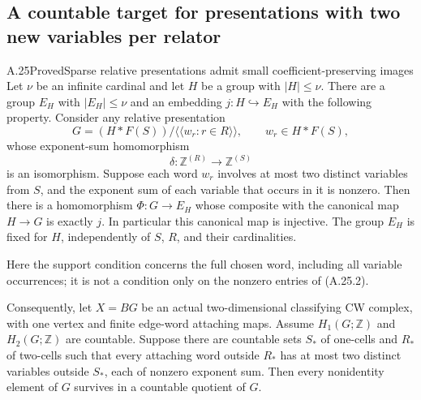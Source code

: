 \subsection{A countable target for presentations with two new variables per relator}

\begin{claim}{A.25}{Proved}{Sparse relative presentations admit small coefficient-preserving images}
Let $\nu$ be an infinite cardinal and let $H$ be a group with
$|H|\leq\nu$. There are a group $E_H$ with $|E_H|\leq\nu$ and an
embedding $j:H\hookrightarrow E_H$ with the following property.
Consider any relative presentation
\[
 G=(H*F(S))/\langle\!\langle w_r:r\in R\rangle\!\rangle,
 \qquad w_r\in H*F(S),
 \tag{A.25.1}
\]
whose exponent-sum homomorphism
\[
 \delta:\mathbb Z^{(R)}\longrightarrow\mathbb Z^{(S)}
 \tag{A.25.2}
\]
is an isomorphism. Suppose each word $w_r$ involves at most two
distinct variables from $S$, and the exponent sum of each variable
that occurs in it is nonzero. Then there is a homomorphism
$\Phi:G\to E_H$ whose composite with the canonical map $H\to G$
is exactly $j$. In particular this canonical map is injective.
The group $E_H$ is fixed for $H$, independently of $S$, $R$, and
their cardinalities.

Here the support condition concerns the full chosen word, including
all variable occurrences; it is not a condition only on the nonzero
entries of (A.25.2).

Consequently, let $X=BG$ be an actual two-dimensional classifying
CW complex, with one vertex and finite edge-word attaching maps.
Assume $H_1(G;\mathbb Z)$ and $H_2(G;\mathbb Z)$ are countable.
Suppose there are countable sets $S_*$ of one-cells and $R_*$ of
two-cells such that every attaching word outside $R_*$ has at
most two distinct variables outside $S_*$, each of nonzero
exponent sum. Then every nonidentity element of $G$ survives
in a countable quotient of $G$.
\end{claim}

